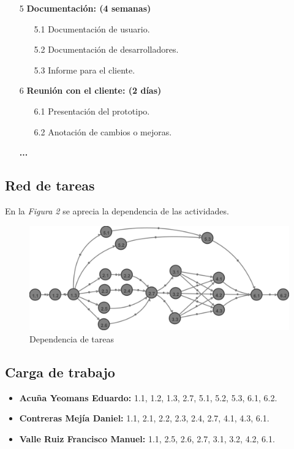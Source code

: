 \documentclass[letterpaper]{article}
\begin{document}
\begin{enumerate}
  \item[5] \textbf{Documentación: (4 semanas)}
    \begin{enumerate}
    \item[5.1] Documentación de usuario.
    \item[5.2] Documentación de desarrolladores.
    \item[5.3] Informe para el cliente.
    \end{enumerate}

  \item[6] \textbf{Reunión con el cliente: (2 días)}
    \begin{enumerate}
    \item[6.1] Presentación del prototipo.
    \item[6.2] Anotación de cambios o mejoras.
    \end{enumerate}
  \item[] \textbf{...}
\end{enumerate}

\subsection{Red de tareas}
En la \emph{Figura 2} se aprecia la dependencia de las actividades.
\begin{figure}[h!]
  \centering
  \includegraphics[width=1\textwidth]{RedTareas}
  \caption{Dependencia de tareas}
\end{figure}

\subsection{Carga de trabajo}
\begin{itemize}
\item \textbf{Acuña Yeomans Eduardo:} 1.1, 1.2, 1.3, 2.7, 5.1, 5.2, 5.3, 6.1, 6.2.
\item \textbf{Contreras Mejía Daniel:} 1.1, 2.1, 2.2, 2.3, 2.4, 2.7, 4.1, 4.3, 6.1.
\item \textbf{Valle Ruiz Francisco Manuel:} 1.1, 2.5, 2.6, 2.7, 3.1, 3.2, 4.2, 6.1.
\end{itemize}
\end{document}
